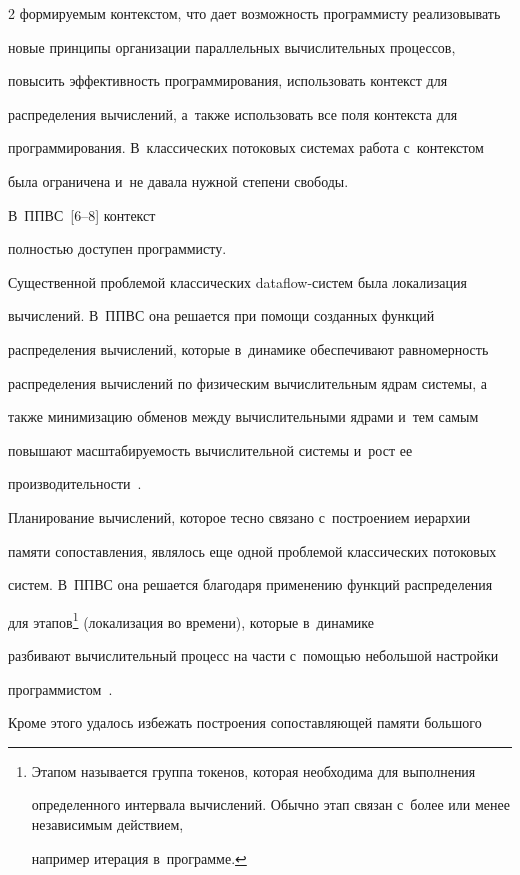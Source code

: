 \begin{multicols}{2}
формируемым контекстом, что дает возможность программи\-сту реализовывать 

новые принципы организации параллельных вычислительных процессов, 

повысить эффективность программирования, использовать контекст для 

распределения вы\-чис\-ле\-ний, а~также использовать все поля контекста для 

программирования. В~классических потоковых сис\-те\-мах работа с~контекстом 

была ограничена и~не давала нужной степени свободы. 

В~ППВС~[6--8] контекст 

полностью доступен программисту.

  

  Существенной проблемой классических dataflow-сис\-тем была локализация 

вычислений. В~ППВС она решается при помощи созданных функций 

распределения вычислений, которые в~динамике обеспечивают равномерность 

распределения вычислений по физическим вычислительным ядрам системы, а~

также минимизацию обменов между вычислительными ядрами и~тем самым 

повышают масштабируемость вычислительной сис\-те\-мы и~рост ее 

производительности~\cite{9-zm}.

  

  Планирование вычислений, которое тесно связано с~построением иерархии 

памяти сопоставления, являлось еще одной проблемой классических потоковых 

систем. В~ППВС она решается благодаря применению функций распределения 

для этапов\footnote{Этапом называется группа токенов, которая необходима для выполнения 

определенного интервала вычислений. Обычно этап связан с~более или менее независимым действием, 

например итерация в~программе.} (локализация во времени), которые в~динамике 

разбивают вычислительный процесс на час\-ти с~по\-мощью небольшой настройки 

программистом~\cite{10-zm}.

  

  Кроме этого удалось избежать построения сопоставляющей памяти большого 


\end{multicols}
